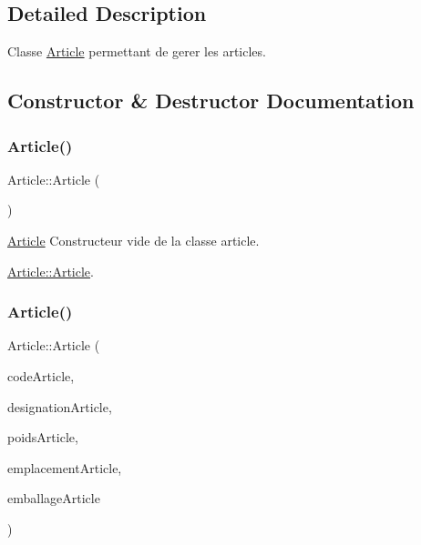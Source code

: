 \subsection{Detailed Description}
Classe \mbox{\hyperlink{class_article}{Article}} permettant de gerer les articles. 

\subsection{Constructor \& Destructor Documentation}
\mbox{\label{class_article_aba1b3142ede0565d468cb4135384c96f}} 
\subsubsection{\texorpdfstring{Article()}{Article()}\hspace{0.1cm}{\footnotesize\ttfamily [1/2]}}
{\footnotesize\ttfamily Article\+::\+Article (\begin{DoxyParamCaption}{ }\end{DoxyParamCaption})}



\mbox{\hyperlink{class_article}{Article}} Constructeur vide de la classe article. 

\mbox{\hyperlink{class_article_aba1b3142ede0565d468cb4135384c96f}{Article\+::\+Article}}. \mbox{\label{class_article_a7422cbd424c70f209ef1bf83ea0fd42e}} 
\subsubsection{\texorpdfstring{Article()}{Article()}\hspace{0.1cm}{\footnotesize\ttfamily [2/2]}}
{\footnotesize\ttfamily Article\+::\+Article (\begin{DoxyParamCaption}\item[{Q\+String}]{code\+Article,  }\item[{Q\+String}]{designation\+Article,  }\item[{int}]{poids\+Article,  }\item[{Q\+String}]{emplacement\+Article,  }\item[{Q\+String}]{emballage\+Article }\end{DoxyParamCaption})}




